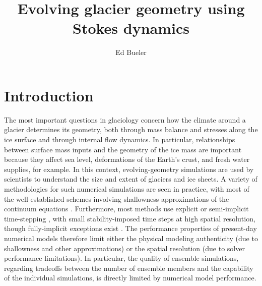 \documentclass[letterpaper,final,12pt,reqno]{amsart}
\begin{document}
\title{Evolving glacier geometry using Stokes dynamics}

\author{Ed Bueler}


\maketitle

\thispagestyle{empty}
\bigskip

\section{Introduction} \label{sec:intro}

The most important questions in glaciology concern how the climate around a glacier determines its geometry, both through mass balance and stresses along the ice surface and through internal flow dynamics.  In particular, relationships between surface mass inputs and the geometry of the ice mass are important because they affect sea level, deformations of the Earth's crust, and fresh water supplies, for example.  In this context, evolving-geometry simulations are used by scientists to understand the size and extent of glaciers and ice sheets.  A variety of methodologies for such numerical simulations are seen in practice, with most of the well-established schemes involving shallowness approximations of the continuum equations \cite[for example]{Hoffmanetal2018,Lipscombetal2019,Winkelmannetal2011}.  Furthermore, most methods use explicit or semi-implicit time-stepping \cite{HindmarshPayne1996,Hoffmanetal2018,Lipscombetal2019,Winkelmannetal2011}, with small stability-imposed time steps at high spatial resolution, though fully-implicit exceptions exist \cite{Brinkerhoffetal2017,Bueler2016}.  The performance properties of present-day numerical models therefore limit either the physical modeling authenticity (due to shallowness and other approximations) or the spatial resolution (due to solver performance limitations).  In particular, the quality of ensemble simulations, regarding tradeoffs between the number of ensemble members and the capability of the individual simulations, is directly limited by numerical model performance.
\end{document}
